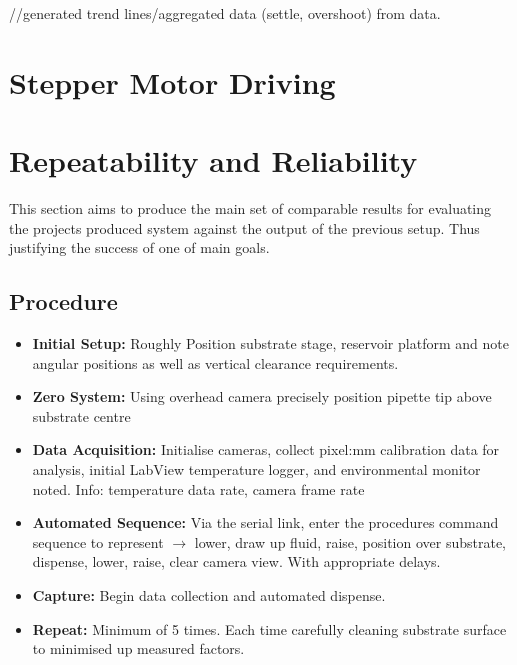 //generated trend lines/aggregated data (settle, overshoot) from data.

\section{Stepper Motor Driving}


\section{Repeatability and Reliability}

This section aims to produce the main set of comparable results for evaluating the projects produced system against the output of the previous setup. Thus justifying the success of one of main goals.

\subsection{Procedure}
\begin{itemize}
    \item \textbf{Initial Setup:} Roughly Position substrate stage, reservoir platform and note angular positions as well as vertical clearance requirements.
    \item \textbf{Zero System:} Using overhead camera precisely position pipette tip above substrate centre
    \item \textbf{Data Acquisition:} Initialise cameras, collect pixel:mm calibration data for analysis, initial LabView temperature logger, and environmental monitor noted. Info: temperature data rate, camera frame rate
    \item \textbf{Automated Sequence:} Via the serial link, enter the procedures command sequence to represent $\rightarrow$ lower, draw up fluid, raise, position over substrate, dispense, lower, raise, clear camera view. With appropriate delays.
    \item \textbf{Capture:} Begin data collection and automated dispense.
    \item \textbf{Repeat: } Minimum of 5 times. Each time carefully cleaning substrate surface to minimised up measured factors. 
\end{itemize}